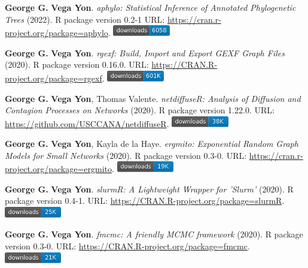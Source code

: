 \documentclass[letterpaper, 10pt]{article}
\newcommand{\myorange}{myteal!70!black}
\newcommand{\darkorange}{\myorange !50!black}
\begin{document}
\section*{\color{\darkorange}{Software {\small (selected)}}}
\vspace{-.25cm}

\begin{enumerate}[label={[}\arabic*{]},labelindent=5\parindent,labelsep=8pt]
\item {\bfseries George G.} {\bfseries Vega Yon}. \textit{{aphylo: Statistical Inference of Annotated Phylogenetic Trees}} (2022). R package version 0.2-1 {\small URL}: \url{https://cran.r-project.org/package=aphylo}. \includegraphics[width=2.5cm]{fig/cran-downloads-aphylo.pdf}
\item {\bfseries George G.} {\bfseries Vega Yon}. \textit{rgexf: Build, Import and Export GEXF Graph Files} (2020). R package version 0.16.0. {\small URL}: \url{https://CRAN.R-project.org/package=rgexf}. \includegraphics[width=2.5cm]{fig/cran-downloads-rgexf.pdf} 
\item {\bfseries George G.} {\bfseries Vega Yon}, Thomas Valente. \textit{{{netdiffuseR: Analysis of Diffusion and Contagion Processes on Networks}}} (2020). R package version 1.22.0. {\small URL}: \url{https://github.com/USCCANA/netdiffuseR}. \includegraphics[width=2.5cm]{fig/cran-downloads-netdiffuser.pdf} 
\item {\bfseries George G.} {\bfseries Vega Yon}, Kayla de la Haye. \textit{ergmito: Exponential Random Graph Models for Small Networks} (2020). R package version 0.3-0. {\small URL}: \url{https://cran.r-project.org/package=ergmito}. \includegraphics[width=2.5cm]{fig/cran-downloads-ergmito.pdf} 
\item {\bfseries George G.} {\bfseries Vega Yon}. \textit{slurmR: A Lightweight Wrapper for 'Slurm'} (2020). R package version 0.4-1. {\small URL}: \url{https://CRAN.R-project.org/package=slurmR}. \includegraphics[width=2.5cm]{fig/cran-downloads-slurmr.pdf} 
\item {\bfseries George G.} {\bfseries Vega Yon}. \textit{fmcmc: A friendly MCMC framework} (2020). R package version 0.3-0. {\small URL}: \url{https://CRAN.R-project.org/package=fmcmc}. \includegraphics[width=2.5cm]{fig/cran-downloads-fmcmc.pdf} 
\end{enumerate}
\end{document}
